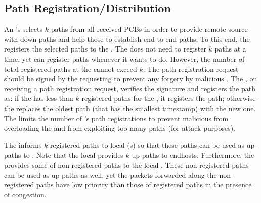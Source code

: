 


\subsection{Path Registration/Distribution}
An \AD's \BS selects $k$ paths from all received PCBs in order to provide remote source \ADs with down-paths and help those \ADs to establish end-to-end paths. To this end, the \BS registers the selected paths to the \TDC \PS. The \BS does not need to register $k$ paths at a time, yet can register paths whenever it wants to do. However, the number of total registered paths at the \TDC \PS cannot exceed $k$. The path registration request should be signed by the requesting \AD to prevent any forgery by malicious \ADs. The \TDC \PS, on receiving a path registration request, verifies the signature and registers the path as: if the \PS has less than $k$ registered paths for the \AD, it registers the path; otherwise the \PS replaces the oldest path (that has the smallest timestamp) with the new one. The \PS limits the number of \AD's path registrations to prevent malicious \ADs from overloading the \TDC \PS and from exploiting too many paths (for attack purposes).

The \BS informs $k$ registered paths to local \PS(s) so that these paths can be used as up-paths to \TDC. Note that the local \PS provides $k$ up-paths to endhosts. Furthermore, the \BS provides some of non-registered paths to the local \PS. These non-registered paths can be used as up-paths as well, yet the packets forwarded along the non-registered paths have low priority than those of registered paths in the presence of congestion. 

